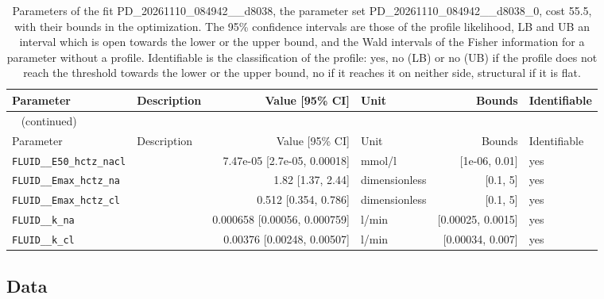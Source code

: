 \documentclass{article}
\begin{document}
\begin{longtable}{llrlrl}
\caption{Parameters of the fit PD\_20261110\_084942\_\_d8038, the parameter set PD\_20261110\_084942\_\_d8038\_0, cost 55.5, with their bounds in the optimization. The 95\% confidence intervals are those of the profile likelihood, LB and UB an interval which is open towards the lower or the upper bound, and the Wald intervals of the Fisher information for a parameter without a profile. Identifiable is the classification of the profile: yes, no (LB) or no (UB) if the profile does not reach the threshold towards the lower or the upper bound, no if it reaches it on neither side, structural if it is flat.}\label{tab:parameters:PD_20261110_084942__d8038} \\
\toprule
Parameter & Description & Value [95\% CI] & Unit & Bounds & Identifiable \\
\midrule
\endfirsthead
\multicolumn{6}{l}{\small\tablename~\thetable{} (continued)} \\
\toprule
Parameter & Description & Value [95\% CI] & Unit & Bounds & Identifiable \\
\midrule
\endhead
\bottomrule
\endlastfoot
\texttt{FLUID\_\_E50\_hctz\_nacl} &  & 7.47e-05 [2.7e-05, 0.00018] & mmol/l & [1e-06, 0.01] & yes \\
\texttt{FLUID\_\_Emax\_hctz\_na} &  & 1.82 [1.37, 2.44] & dimensionless & [0.1, 5] & yes \\
\texttt{FLUID\_\_Emax\_hctz\_cl} &  & 0.512 [0.354, 0.786] & dimensionless & [0.1, 5] & yes \\
\texttt{FLUID\_\_k\_na} &  & 0.000658 [0.00056, 0.000759] & l/min & [0.00025, 0.0015] & yes \\
\texttt{FLUID\_\_k\_cl} &  & 0.00376 [0.00248, 0.00507] & l/min & [0.00034, 0.007] & yes \\
\end{longtable}

\subsection{Data}
\end{document}
